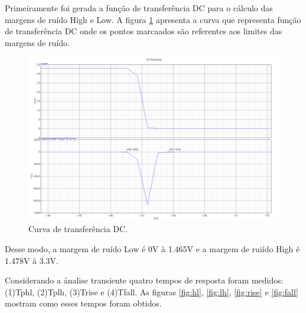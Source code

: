 \documentclass[a4paper,10pt] {article}
\begin{document}
Primeiramente foi gerada a função de transferência DC para o cálculo das margens de ruído High e Low. A figura \ref{fig:dc} apresenta a curva que representa função de transferência DC onde os pontos marcaados são referentes aos limites das margens de ruído.

\begin{figure} [h]
	\label{fig:dc}
	\centering
	\includegraphics[scale=0.1]{DC_Buffer.png}
	\caption{Curva de transferência DC.}
\end{figure}

Desse modo, a margem de ruído Low é 0V à 1.465V e a margem de ruiído High é 1.478V à 3.3V.

Considerando a ánalise transiente quatro tempos de resposta foram medidos: (1)Tphl, (2)Tplh, (3)Trise e (4)Tfall. As figuras \ref{fig:hl}, \ref{fig:lh}, \ref{fig:rise} e \ref{fig:fall} mostram como esses tempos foram obtidos.
\end{document}

